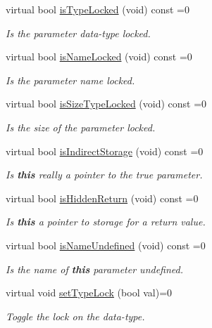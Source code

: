 \begin{DoxyCompactItemize}
virtual bool \mbox{\hyperlink{class_proto_parameter_a155b564b34ae0b36d39d5a1caf5d0014}{is\+Type\+Locked}} (void) const =0
\begin{DoxyCompactList}\small\item\em Is the parameter data-\/type locked. \end{DoxyCompactList}\item 
virtual bool \mbox{\hyperlink{class_proto_parameter_ae8d61607d66c96ac0fc9e0e6b7a100f1}{is\+Name\+Locked}} (void) const =0
\begin{DoxyCompactList}\small\item\em Is the parameter name locked. \end{DoxyCompactList}\item 
virtual bool \mbox{\hyperlink{class_proto_parameter_ad1a249d140c17d040845d0bcf8307fd0}{is\+Size\+Type\+Locked}} (void) const =0
\begin{DoxyCompactList}\small\item\em Is the size of the parameter locked. \end{DoxyCompactList}\item 
virtual bool \mbox{\hyperlink{class_proto_parameter_a07008f520e34c236298de7f652c22657}{is\+Indirect\+Storage}} (void) const =0
\begin{DoxyCompactList}\small\item\em Is {\bfseries{this}} really a pointer to the true parameter. \end{DoxyCompactList}\item 
virtual bool \mbox{\hyperlink{class_proto_parameter_a104c1c7a9873fafe0394d23bb35feeb4}{is\+Hidden\+Return}} (void) const =0
\begin{DoxyCompactList}\small\item\em Is {\bfseries{this}} a pointer to storage for a return value. \end{DoxyCompactList}\item 
virtual bool \mbox{\hyperlink{class_proto_parameter_a62d78489a16faff7cff6db6a1cf2593f}{is\+Name\+Undefined}} (void) const =0
\begin{DoxyCompactList}\small\item\em Is the name of {\bfseries{this}} parameter undefined. \end{DoxyCompactList}\item 
virtual void \mbox{\hyperlink{class_proto_parameter_a91f745d13f913e959f724e7259c52fa2}{set\+Type\+Lock}} (bool val)=0
\begin{DoxyCompactList}\small\item\em Toggle the lock on the data-\/type. \end{DoxyCompactList}\item 

\end{DoxyCompactItemize}
